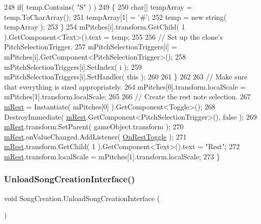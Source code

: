 \begin{DoxyCode}
248                 \textcolor{keywordflow}{if}( temp.Contains( \textcolor{stringliteral}{"S"} ) )
249                 \{
250                     \textcolor{keywordtype}{char}[] tempArray = temp.ToCharArray();
251                     tempArray[1] = \textcolor{charliteral}{'#'};
252                     temp = \textcolor{keyword}{new} string( tempArray );
253                 \}
254                 mPitches[i].transform.GetChild( 1 ).GetComponent<Text>().text = temp;
255 
256                 \textcolor{comment}{// Set up the clone's PitchSelectionTrigger.}
257                 mPitchSelectionTriggers[i] = mPitches[i].GetComponent<PitchSelectionTrigger>();
258                 mPitchSelectionTriggers[i].SetIndex( i );
259                 mPitchSelectionTriggers[i].SetHandler( \textcolor{keyword}{this} );
260 
261             \}
262 
263             \textcolor{comment}{// Make sure that everything is sized appropriately.}
264             mPitches[0].transform.localScale = mPitches[1].transform.localScale;
265 
266             \textcolor{comment}{// Create the rest note selection.}
267             \hyperlink{group___s_c_handlers_ga41e99d322cb92a3eb304bef704af2b7a}{mRest} = Instantiate( mPitches[0] ).GetComponent<Toggle>();
268             DestroyImmediate( \hyperlink{group___s_c_handlers_ga41e99d322cb92a3eb304bef704af2b7a}{mRest}.GetComponent<PitchSelectionTrigger>(), \textcolor{keyword}{false} );
269             \hyperlink{group___s_c_handlers_ga41e99d322cb92a3eb304bef704af2b7a}{mRest}.transform.SetParent( gameObject.transform );
270             \hyperlink{group___s_c_handlers_ga41e99d322cb92a3eb304bef704af2b7a}{mRest}.onValueChanged.AddListener( \hyperlink{group___s_c_handlers_ga6099b691cc9af45777cfc76f3f681efe}{OnRestToggle} );
271             \hyperlink{group___s_c_handlers_ga41e99d322cb92a3eb304bef704af2b7a}{mRest}.transform.GetChild( 1 ).GetComponent<Text>().text = \textcolor{stringliteral}{"Rest"};
272             \hyperlink{group___s_c_handlers_ga41e99d322cb92a3eb304bef704af2b7a}{mRest}.transform.localScale = mPitches[1].transform.localScale;
273         \}
\end{DoxyCode}
\mbox{\label{group___s_c_handlers_gae631852736624d333cc26e1ae9d14871}} 
\subsubsection{\texorpdfstring{Unload\+Song\+Creation\+Interface()}{UnloadSongCreationInterface()}}
{\footnotesize\ttfamily void Song\+Creation.\+Unload\+Song\+Creation\+Interface (\begin{DoxyParamCaption}{ }\end{DoxyParamCaption})}



